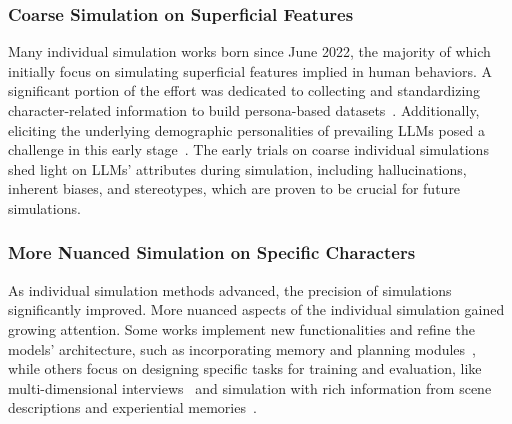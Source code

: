 \subsubsection{Coarse Simulation on Superficial Features}
Many individual simulation works born since June 2022, the majority of which initially focus on simulating superficial features implied in human behaviors. A significant portion of the effort was dedicated to collecting and standardizing character-related information to build persona-based datasets~\cite{chen2023largelanguagemodelsmeet,schwitzgebel2023creatinglargelanguagemodel}. Additionally, eliciting the underlying demographic personalities of prevailing LLMs posed a challenge in this early stage~\cite{serapiogarcía2023personalitytraitslargelanguage,pan2023llmspossesspersonalitymaking}. The early trials on coarse individual simulations shed light on LLMs' attributes during simulation, including hallucinations, inherent biases, and stereotypes, which are proven to be crucial for future simulations.


\subsubsection{More Nuanced Simulation on Specific Characters}
As individual simulation methods advanced, the precision of simulations significantly improved. 
More nuanced aspects of the individual simulation gained growing attention. Some works implement new functionalities and refine the models' architecture, such as incorporating memory and planning modules~\cite{abbasian2024conversationalhealthagentspersonalized,xu2024characterdestinylargelanguage}, while others focus on designing specific tasks for training and evaluation, like multi-dimensional interviews~\cite{wang2024incharacterevaluatingpersonalityfidelity} and simulation with rich information from scene descriptions and experiential memories~\cite{wang2024rolellmbenchmarkingelicitingenhancing}.


